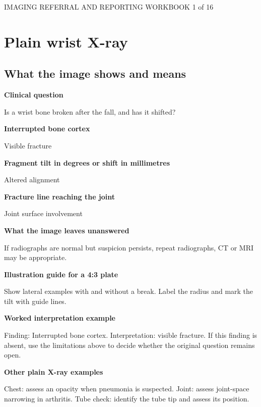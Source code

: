 \documentclass[11pt,a4paper]{article}
\begin{document}
\newpage

{\small IMAGING REFERRAL AND REPORTING WORKBOOK \hfill 1 of 16}

\section*{Plain wrist X-ray}

\subsection*{What the image shows and means}

\textbf{Clinical question}\par Is a wrist bone broken after the fall, and has it shifted?\par

\textbf{Interrupted bone cortex}\par Visible fracture\par

\textbf{Fragment tilt in degrees or shift in millimetres}\par Altered alignment\par

\textbf{Fracture line reaching the joint}\par Joint surface involvement\par

\textbf{What the image leaves unanswered}\par If radiographs are normal but suspicion persists, repeat radiographs, CT or MRI may be appropriate.\par

\textbf{Illustration guide for a 4:3 plate}\par Show lateral examples with and without a break. Label the radius and mark the tilt with guide lines.\par

\textbf{Worked interpretation example}\par Finding: Interrupted bone cortex. Interpretation: visible fracture. If this finding is absent, use the limitations above to decide whether the original question remains open.\par

\textbf{Other plain X-ray examples}\par Chest: assess an opacity when pneumonia is suspected. Joint: assess joint-space narrowing in arthritis. Tube check: identify the tube tip and assess its position.\par
\end{document}
